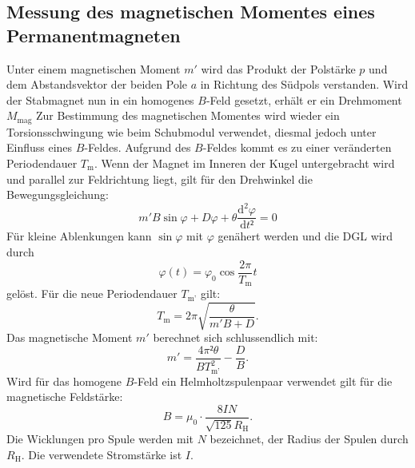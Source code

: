 \subsection{Messung des magnetischen Momentes eines Permanentmagneten}
Unter einem magnetischen Moment $m'$ wird das Produkt der Polstärke $p$
 und dem Abstandsvektor der beiden Pole $a$ in Richtung des Südpols verstanden.
  Wird der Stabmagnet nun in ein homogenes $B$-Feld gesetzt,
   erhält er ein Drehmoment $M_{\text{mag}}$
Zur Bestimmung des magnetischen Momentes wird wieder ein Torsionsschwingung wie
 beim Schubmodul verwendet, diesmal jedoch unter Einfluss eines $B$-Feldes.
  Aufgrund des $B$-Feldes kommt es zu einer veränderten Periodendauer $T_\text{m}$.  Wenn
  der Magnet im Inneren der Kugel untergebracht wird und parallel zur Feldrichtung
  liegt, gilt für den Drehwinkel \varphi die Bewegungsgleichung:
  \begin{equation}
    m'B\sin\varphi + D\varphi + \theta\frac{\text{d}^2\varphi}{\text{d}t²} = 0
  \end{equation}
  Für kleine Ablenkungen kann $\sin \varphi$ mit $\varphi$ genähert werden und die DGL wird durch
  \begin{equation}
    \varphi(t) = \varphi_\text{0} \cos\frac{2\pi}{T_\text{m}}t
  \end{equation}
  gelöst. Für die neue Periodendauer $T_\text{m'}$ gilt:
  \begin{equation}
    T_\text{m} = 2\pi\sqrt{\frac{\theta}{m'B + D}}\text{.}
  \end{equation}
Das magnetische Moment $m'$ berechnet sich schlussendlich mit:
\begin{equation}
  m' = \frac{4\pi²\theta}{BT_\text{m'}^2} - \frac{D}{B}\text{.}
\end{equation}
Wird für das homogene $B$-Feld ein Helmholtzspulenpaar verwendet gilt für die
 magnetische Feldstärke:
 \begin{equation}
   B = \mu_0 \cdot \frac{8 I N}{\sqrt{125}R_\text{H}}\text{.}
 \end{equation}
Die Wicklungen pro Spule werden mit $N$ bezeichnet, der Radius der Spulen durch $R_\text{H}$.
 Die verwendete Stromstärke ist $I$.

